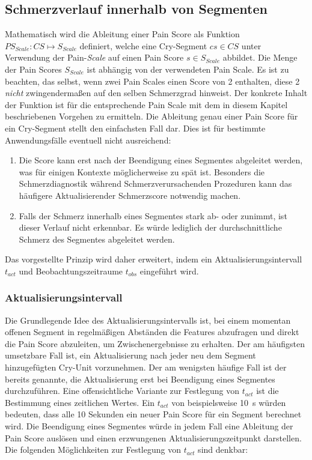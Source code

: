 \subsection{Schmerzverlauf innerhalb von Segmenten}
\label{sec:regressionPainScore}

Mathematisch wird die Ableitung einer Pain Score als Funktion $PS_{Scale}: CS \mapsto S_{Scale}$ definiert, welche eine Cry-Segment $cs \in CS$ unter Verwendung der Pain-\emph{Scale} auf einen Pain Score $s \in S_{Scale}$ abbildet. Die Menge der Pain Scores $S_{Scale}$ ist abhängig von der verwendeten Pain Scale. Es ist zu beachten, das selbst, wenn zwei Pain Scales einen Score von 2 enthalten, diese 2 \emph{nicht} zwingendermaßen auf den selben Schmerzgrad hinweist. Der konkrete Inhalt der Funktion ist für die entsprechende Pain Scale mit dem in diesem Kapitel beschriebenen Vorgehen zu ermitteln. Die Ableitung genau einer Pain Score für ein Cry-Segment stellt den einfachsten Fall dar. Dies ist für bestimmte Anwendungsfälle eventuell nicht ausreichend: 
\begin{enumerate}
\item Die Score kann erst nach der Beendigung eines Segmentes abgeleitet werden, was für einigen Kontexte möglicherweise zu spät ist. Besonders die Schmerzdiagnostik während Schmerzverursachenden Prozeduren kann das häufigere \glqq Aktualisieren\grqq der Schmerzscore notwendig machen.
\item Falls der Schmerz innerhalb eines Segmentes stark ab- oder zunimmt, ist dieser Verlauf nicht erkennbar. Es würde lediglich der \glqq durchschnittliche Schmerz\grqq{} des Segmentes abgeleitet werden.
\end{enumerate}

Das vorgestellte Prinzip wird daher erweitert, indem ein Aktualisierungsintervall $t_{act}$ und Beobachtungszeitraume $t_{obs}$ eingeführt wird.

\subsubsection{Aktualisierungsintervall}
\label{sec:actualization}

 Die Grundlegende Idee des Aktualisierungsintervalls ist, bei einem momentan offenen Segment in regelmäßigen Abständen die Features abzufragen und direkt die Pain Score abzuleiten, um Zwischenergebnisse zu erhalten. Der am häufigsten umsetzbare Fall ist, ein Aktualisierung nach jeder neu dem Segment hinzugefügten Cry-Unit vorzunehmen. Der am wenigsten häufige Fall ist der bereits genannte, die Aktualisierung erst bei Beendigung eines Segmentes durchzuführen. Eine offensichtliche Variante zur Festlegung von $t_{act}$ ist die Bestimmung eines zeitlichen Wertes. Ein $t_{act}$ von beispielsweise \SI{10}{\second} würden bedeuten, dass alle 10 Sekunden ein neuer Pain Score für ein Segment berechnet wird. Die Beendigung eines Segmentes würde in jedem Fall eine Ableitung der Pain Score auslösen und einen \glqq erzwungenen Aktualisierungszeitpunkt\grqq{} darstellen. Die folgenden Möglichkeiten zur Festlegung von $t_{act}$ sind denkbar:
 
